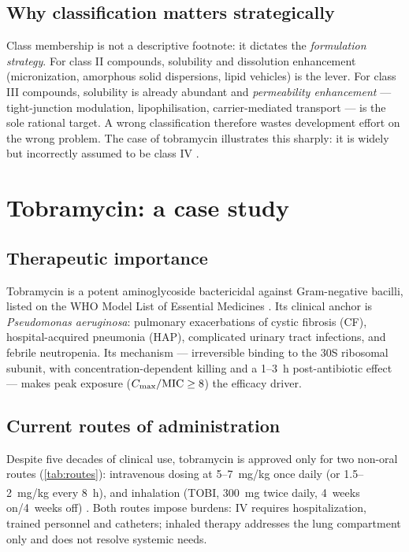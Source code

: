 \subsection{Why classification matters strategically}
Class membership is not a descriptive footnote: it dictates the \emph{formulation strategy}. For class II compounds, solubility and dissolution enhancement (micronization, amorphous solid dispersions, lipid vehicles) is the lever. For class III compounds, solubility is already abundant and \emph{permeability enhancement} --- tight-junction modulation, lipophilisation, carrier-mediated transport --- is the sole rational target. A wrong classification therefore wastes development effort on the wrong problem. The case of tobramycin illustrates this sharply: it is widely but incorrectly assumed to be class IV \citep{Asad2023}.

\section{Tobramycin: a case study}
\label{sec:tob-case}

\subsection{Therapeutic importance}
Tobramycin is a potent aminoglycoside bactericidal against Gram-negative bacilli, listed on the WHO Model List of Essential Medicines \citep{WHO2023}. Its clinical anchor is \textit{Pseudomonas aeruginosa}: pulmonary exacerbations of cystic fibrosis (CF), hospital-acquired pneumonia (HAP), complicated urinary tract infections, and febrile neutropenia. Its mechanism --- irreversible binding to the 30S ribosomal subunit, with concentration-dependent killing and a 1--3~h post-antibiotic effect \citep{Craig1998} --- makes peak exposure ($C_{\max}/\mathrm{MIC} \geq 8$) the efficacy driver.

\subsection{Current routes of administration}
Despite five decades of clinical use, tobramycin is approved only for two non-oral routes (\cref{tab:routes}): intravenous dosing at 5--7~mg/kg once daily (or 1.5--2~mg/kg every 8~h), and inhalation (TOBI\textsuperscript{\textregistered}, 300~mg twice daily, 4~weeks on/4~weeks off) \citep{Ramsey1999, Smyth2005}. Both routes impose burdens: IV requires hospitalization, trained personnel and catheters; inhaled therapy addresses the lung compartment only and does not resolve systemic needs.

